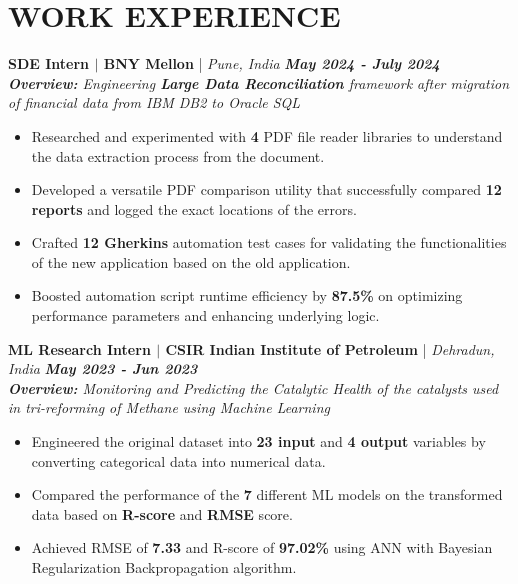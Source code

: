 \documentclass[a4paper,9pt]{extarticle}
\begin{document}
\section*{WORK EXPERIENCE}
\vspace{-0.2cm}
\noindent
\textbf{SDE Intern $|$ BNY Mellon} | \textit{Pune, India} \hfill \textbf{\textit{May 2024 - July 2024}} \\ %
\textit{\textbf{Overview:} Engineering \textbf{Large Data Reconciliation} framework after migration of financial data from IBM DB2 to Oracle SQL}  %
\vspace{-0.15cm}
\begin{itemize} %
    \item Researched and experimented with \textbf{4} PDF file reader libraries to understand the data extraction process from the document.
    \item Developed a versatile PDF comparison utility that successfully compared \textbf{12 reports} and logged the exact locations of the errors.
    \item Crafted \textbf{12 Gherkins} automation test cases for validating the functionalities of the new application based on the old application.
    \item Boosted automation script runtime efficiency by \textbf{87.5\%} on optimizing performance parameters and enhancing underlying logic.
\end{itemize}

\vspace{-0.1cm}
\noindent
\textbf{ML Research Intern $|$ CSIR Indian Institute of Petroleum} | \textit{Dehradun, India} \hfill \textbf{\textit{May 2023 - Jun 2023}}\\ %
\textit{\textbf{Overview:} Monitoring and Predicting the Catalytic Health of the catalysts used in tri-reforming of Methane using Machine Learning}  %
\vspace{-0.1cm}
\begin{itemize} %
    \item Engineered the original dataset into \textbf{23 input} and \textbf{4 output} variables by converting categorical data into numerical data.
    \item Compared the performance of the \textbf{7} different ML models on the transformed data based on \textbf{R-score} and \textbf{RMSE} score.
    \item Achieved RMSE of \textbf{7.33} and R-score of \textbf{97.02\%} using ANN with Bayesian Regularization Backpropagation algorithm.
\end{itemize}
\end{document}
